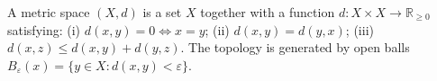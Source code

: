 A metric space $(X, d)$ is a set $X$ together with a function $d: X \times X \to \mathbb{R}_{\geq 0}$ satisfying: (i) $d(x, y) = 0 \iff x = y$; (ii) $d(x, y) = d(y, x)$; (iii) $d(x, z) \leq d(x, y) + d(y, z)$. The topology is generated by open balls $B_\varepsilon(x) = \{y \in X : d(x, y) < \varepsilon\}$.
